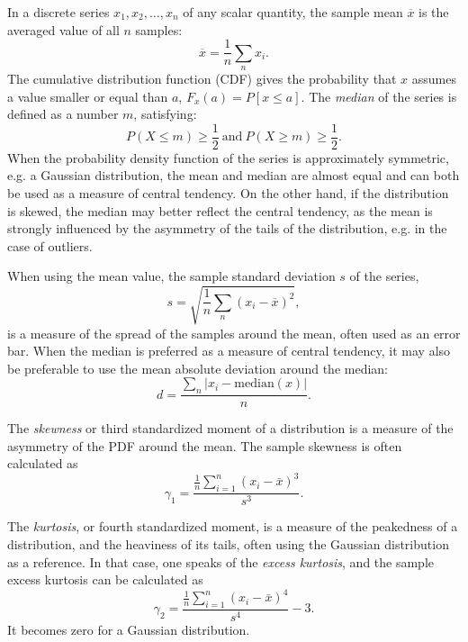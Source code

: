 In a discrete series $x_1,x_2,\ldots,x_n$ of any scalar quantity, the sample mean $\overline{x}$ is the averaged value of all $n$ samples:%
\begin{equation}
 \overline{x}=\frac{1}{n}\sum_{n}x_i.
\end{equation}
\noindent The cumulative distribution function (CDF) gives the probability that $x$ assumes a value smaller or equal than $a$, $F_x(a)=P[x\leq{a}]$. The \emph{median} of the series is defined as a number $m$, satisfying: %
\begin{equation}
 P(X\leq{m})\geq\frac{1}{2}\ \mathrm{and}\ P(X\geq{m})\geq\frac{1}{2}.
\end{equation}
\noindent When the probability density function of the series is approximately symmetric, e.g. a Gaussian distribution, the mean and median are almost equal and can both be used as a measure of central tendency. On the other hand, if the distribution is skewed, the median may better reflect the central tendency, as the mean is strongly influenced by the asymmetry of the tails of the distribution, e.g. in the case of outliers.

When using the mean value, the sample standard deviation $s$ of the series, %
\begin{equation}
 s=\sqrt{\frac{1}{n}\sum_n(x_i-\overline{x})^2},
\end{equation}
\noindent is a measure of the spread of the samples around the mean, often used as an error bar. When the median is preferred as a measure of central tendency, it may also be preferable to use the mean absolute deviation around the median: %
\begin{equation}
 d=\frac{\sum_n|x_i-\mathrm{median}(x)|}{n}.
\end{equation}

The \emph{skewness} or third standardized moment of a distribution is a measure of the asymmetry of the PDF around the mean. The sample skewness is often calculated as
\begin{equation}
  \gamma_1 = \frac{\frac{1}{n}\sum_{i=1}^n (x_i-\bar{x})^3}{s^3}.
\end{equation}

The \emph{kurtosis}, or fourth standardized moment, is a measure of the peakedness of a distribution, and the heaviness of its tails, often using the Gaussian distribution as a reference. In that case, one speaks of the \emph{excess kurtosis}, and the sample excess kurtosis can be calculated as
\begin{equation}
  \gamma_2 = \frac{\frac{1}{n}\sum_{i=1}^n (x_i-\bar{x})^4}{s^4} - 3.
\end{equation}
It becomes zero for a Gaussian distribution.


